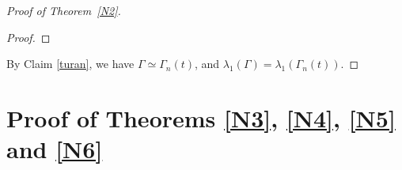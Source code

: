 \documentclass[10pt,a4paper]{amsart}
\numberwithin{equation}{section}
\newtheorem {Theorem} {Theorem}[section]
\begin{document}
\begin{proof}[Proof of Theorem~\ref{N2}]
\begin{proof}
%
%
%
\end{proof}

By Claim \ref{turan}, we have $\Gamma\simeq \Gamma_n(t)$, and $\lambda_1(\Gamma)=\lambda_1(\Gamma_n(t))$. 
\end{proof}







\section{Proof of Theorems \ref{N3}, \ref{N4}, \ref{N5} and \ref{N6}} 


\end{document}
